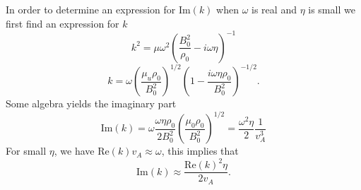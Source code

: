 In order to determine an expression for Im\((k)\) when \(\omega \) is real and \(\eta \) is small we first find an expression for \(k\)
\begin{equation*}
	k^2 = \mu\omega^2\left(\dfrac{B_0^2}{\rho_0} - i\omega\eta \right)^{-1}
\end{equation*}
\begin{equation*}
	k = \omega\left(\dfrac{\mu_u\rho_0}{B_0^2}\right)^{1/2}\left(1 - \dfrac{i\omega\eta\rho_0}{B_0^2} \right)^{-1/2}.
\end{equation*}
Some algebra yields the imaginary part
\begin{equation*}
	\text{Im}(k) = \omega\dfrac{\omega\eta\rho_0}{2B_0^2}\left(\dfrac{\mu_0\rho_0}{B_0^2}\right)^{1/2} = \dfrac{\omega^2\eta}{2}\dfrac{1}{v^3_A}
\end{equation*}
For small \(\eta\), we have Re\((k)v_A \approx \omega\), this implies that
\begin{equation*}
	\text{Im}(k) \approx \dfrac{\text{Re}(k)^2\eta}{2v_A}.
\end{equation*}






